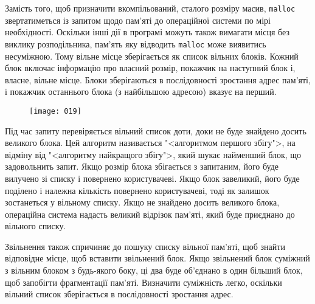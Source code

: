 \documentclass[a4paper,12pt]{book}
\begin{document}
  Замість того, щоб призначити вкомпільований, сталого розміру масив, \texttt{malloc}
  звертатиметься із запитом щодо пам'яті до операційної системи по мірі необхідності.
  Оскільки інші дії в програмі можуть також вимагати місця без виклику розподільника,
  пам'ять яку відводить \texttt{malloc} може виявитись несуміжною. Тому вільне місце
  зберігається як список вільних блоків. Кожний блок включає інформацію про власний
  розмір, покажчик на наступний блок і, власне, вільне місце. Блоки зберігаються в
  послідовності зростання адрес пам'яті, і покажчик останнього блока (з найбільшою
  адресою) вказує на перший.

%
  \begin{figure}[!htb]
  \centering
  \texttt{[image: 019]}
  \end{figure}

  Під час запиту перевіряється вільний список доти, доки не буде знайдено досить великого
  блока. Цей алгоритм називається "<алгоритмом першого збігу">, на відміну від
  "<алгоритму найкращого збігу">, який шукає найменший блок, що задовольнить
  запит. Якщо розмір блока збігається з запитаним, його буде вилучено зі списку і
  повернено користувачеві. Якщо блок завеликий, його буде поділено і належна кількість
  повернено користувачеві, тоді як залишок зостанеться у вільному списку. Якщо не знайдено
  досить великого блока, операційна система надасть великий відрізок пам'яті, який буде
  приєднано до вільного списку.

  Звільнення також спричиняє до пошуку списку вільної пам'яті, щоб знайти відповідне місце,
  щоб вставити звільнений блок. Якщо звільнений блок суміжний з вільним блоком з
  будь-якого боку, ці два буде об'єднано в один більший блок, щоб запобігти фрагментації
  пам'яті. Визначити суміжність легко, оскільки вільний список зберігається в
  послідовності зростання адрес.
\end{document}
